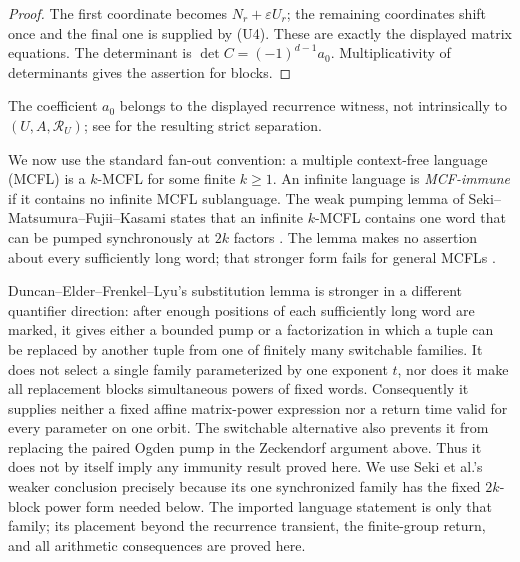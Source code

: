 \begin{proof}
  The first coordinate becomes \(N_r+\varepsilon U_r\); the remaining
  coordinates shift once and the final one is supplied by \textup{(U4)}.
  These are exactly the displayed matrix equations. The determinant
  is \(\det C=(-1)^{d-1}a_0\). Multiplicativity of determinants gives
  the assertion for blocks.
\end{proof}

The coefficient \(a_0\) belongs to the displayed recurrence witness,
not intrinsically to \((U,A,\mathcal R_U)\); see
 for the resulting strict
separation.

We now use the standard fan-out convention: a multiple context-free
language (MCFL) is a \(k\)-MCFL for some finite \(k\ge1\). An infinite
language is \emph{MCF-immune} if it contains no infinite MCFL
sublanguage. The weak pumping lemma of Seki--Matsumura--Fujii--Kasami
states that an infinite \(k\)-MCFL contains one word that can be pumped
synchronously at \(2k\) factors \cite[Lemma~3.2]{SekiEtAl1991}. The
  lemma makes no assertion about every sufficiently long word; that
  stronger form fails for general MCFLs
  \cite{KanazawaKobeleMichaelisSalvatiYoshinaka2014}.

  Duncan--Elder--Frenkel--Lyu's substitution lemma
  \cite[Theorem~4.5]{DuncanElderFrenkelLiu2026} is stronger in a different
  quantifier direction: after enough positions of each sufficiently long
  word are marked, it gives either a bounded pump or a factorization in
  which a tuple can be replaced by another tuple from one of finitely many
  switchable families. It does not select a single family parameterized by
  one exponent \(t\), nor does it make all replacement blocks simultaneous
  powers of fixed words. Consequently it supplies neither a fixed affine
  matrix-power expression nor a return time valid for every parameter on
  one orbit. The switchable alternative also prevents it from replacing the
  paired Ogden pump in the Zeckendorf argument above. Thus it does not by
  itself imply any immunity result proved here. We use Seki et al.'s weaker
  conclusion precisely because its one synchronized family has the fixed
  \(2k\)-block power form needed below. The imported language statement is
  only that family; its placement beyond the recurrence transient, the
  finite-group return, and all arithmetic consequences are proved here.

